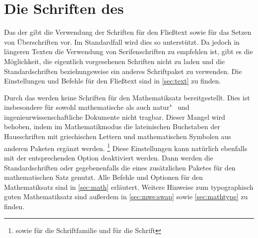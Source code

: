 \documentclass[%
  english,ngerman,%
  headings=optiontoheadandtoc,captions=tableheading,numbers=noenddot,%
  chapterpage,cdfoot,%
]{tudscrman}
\begin{document}
\section{Die Schriften des \CDs}
Das \CD der \TnUD gibt die Verwendung der Schriften \Univers für den Fließtext 
sowie \DIN für das Setzen von Überschriften vor. Im Standardfall wird dies so 
unterstützt. Da jedoch in längeren Texten die Verwendung von Serifenschriften zu 
empfehlen ist, gibt es die Möglichkeit, die eigentlich vorgesehenen Schriften 
nicht zu laden und die Standardschriften beziehungsweise ein anderes 
Schriftpaket zu verwenden. Die Einstellungen und Befehle für den Fließtext sind 
in \autoref{sec:text} zu finden.

Durch das \CD werden keine Schriften für den Mathematiksatz bereitgestellt. Dies 
ist insbesondere für sowohl mathematische als auch natur"~ und 
ingenieurwissenschaftliche Dokumente nicht tragbar. Dieser Mangel wird behoben, 
indem im Mathematikmodus die lateinischen Buchstaben der Hausschriften mit 
griechischen Lettern und mathematischen Symbolen aus anderen Paketen ergänzt 
werden.%
\footnote{%
   sowie  für die Schriftfamilie \Univers und 
   für die Schrift \DIN%
}
Diese Einstellungen kann natürlich ebenfalls mit der entsprechenden Option 
deaktiviert werden. Dann werden die Standardschriften oder gegebenenfalls die 
eines zusätzlichen Paketes für den mathematischen Satz genutzt. Alle Befehle und 
Optionen für den Mathematiksatz sind in \autoref{sec:math} erläutert. Weitere 
Hinweise zum typographisch guten Mathematiksatz sind außerdem in 
\autoref{sec:mwe:swap} sowie \autoref{sec:mathtype} zu finden.
\end{document}
